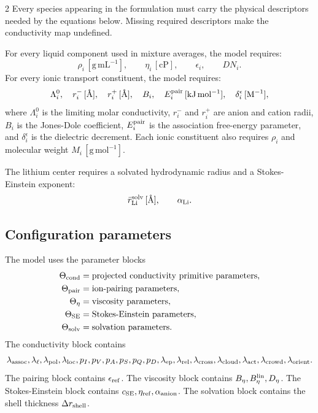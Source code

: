 \documentclass[10pt]{article}
\newcommand{\cp}{\mathrm{cP}}
\newcommand{\Ang}{\text{\AA}}
\begin{document}
\begin{multicols}{2}
Every species appearing in the formulation must carry the physical descriptors
needed by the equations below. Missing required descriptors make the
conductivity map undefined.

For every liquid component used in mixture averages, the model requires:
\[
\rho_i\,[\mathrm{g\,mL^{-1}}],
\qquad
\eta_i\,[\cp],
\qquad
\epsilon_i,
\qquad
DN_i.
\]
For every ionic transport constituent, the model requires:
\[
\Lambda^0_i,\quad
r^-_i\,[\Ang],\quad
r^+_i\,[\Ang],\quad
B_i,\quad
E^{\rm pair}_i\,[\mathrm{kJ\,mol^{-1}}],\quad
\delta^\epsilon_i\,[\mathrm{M^{-1}}],
\]
where \(\Lambda_i^0\) is the limiting molar conductivity, \(r_i^-\) and
\(r_i^+\) are anion and cation radii, \(B_i\) is the Jones-Dole coefficient,
\(E_i^{\rm pair}\) is the association free-energy parameter, and
\(\delta_i^\epsilon\) is the dielectric decrement. Each ionic constituent also
requires \(\rho_i\) and molecular weight \(M_i\,[\mathrm{g\,mol^{-1}}]\).

The lithium center requires a solvated hydrodynamic radius and a
Stokes-Einstein exponent:
\[
\bar r_{\rm Li}^{\rm solv}\,[\Ang],
\qquad
\alpha_{\rm Li}.
\]

\subsection{Configuration parameters}

The model uses the parameter blocks
\[
\begin{aligned}
\Theta_{\rm cond}&=\text{projected conductivity primitive parameters},\\
\Theta_{\rm pair}&=\text{ion-pairing parameters},\\
\Theta_{\eta}&=\text{viscosity parameters},\\
\Theta_{\rm SE}&=\text{Stokes-Einstein parameters},\\
\Theta_{\rm solv}&=\text{solvation parameters}.
\end{aligned}
\]
The conductivity block contains
\[
\lambda_{\rm assoc},\lambda_{\ell},\lambda_{\rm pol},
\lambda_{\rm loc},p_I,p_V,p_A,p_S,p_Q,p_D,
\lambda_{\rm ep},\lambda_{\rm rel},\lambda_{\rm cross},
\lambda_{\rm cloud},\lambda_{\rm act},
\lambda_{\rm crowd},\lambda_{\rm orient}.
\]
The pairing block contains \(\epsilon_{\rm ref}\). The viscosity block contains
\(B_\eta,B_\eta^{\rm lin},D_\eta\). The Stokes-Einstein block contains
\(c_{\rm SE},\eta_{\rm ref},\alpha_{\rm anion}\). The solvation block contains
the shell thickness \(\Delta r_{\rm shell}\).


\end{multicols}
\end{document}
